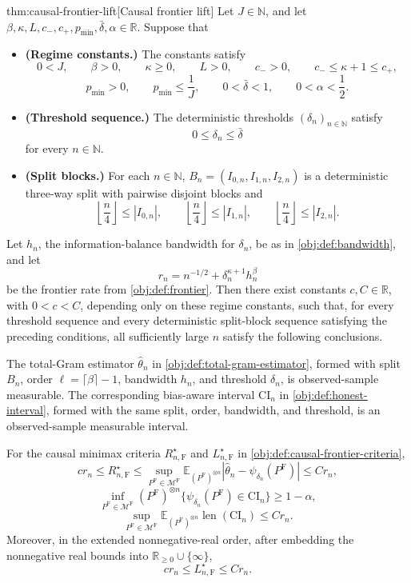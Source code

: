 \begin{theoremv}{thm:causal-frontier-lift}[Causal frontier lift]
Let \(J\in\mathbb N\), and let \(\beta,\kappa,L,c_-,c_+,p_{\min},\bar\delta,\alpha\in\mathbb R\). Suppose that
\begin{itemize}
\item \textbf{(Regime constants.)} The constants satisfy
\[
0<J,\qquad
\beta>0,\qquad
\kappa\geq0,\qquad
L>0,\qquad
c_->0,\qquad
c_-\leq \kappa+1\leq c_+,
\]
\[
p_{\min}>0,\qquad
p_{\min}\leq \frac1J,\qquad
0<\bar\delta<1,\qquad
0<\alpha<\frac12 .
\]
\item \textbf{(Threshold sequence.)} The deterministic thresholds \((\delta_n)_{n\in\mathbb N}\) satisfy
\[
0\leq \delta_n\leq \bar\delta
\]
for every \(n\in\mathbb N\).
\item \textbf{(Split blocks.)} For each \(n\in\mathbb N\), \(B_n=(I_{0,n},I_{1,n},I_{2,n})\) is a deterministic three-way split with pairwise disjoint blocks and
\[
\left\lfloor \frac n4\right\rfloor\leq |I_{0,n}|,\qquad
\left\lfloor \frac n4\right\rfloor\leq |I_{1,n}|,\qquad
\left\lfloor \frac n4\right\rfloor\leq |I_{2,n}|.
\]
\end{itemize}
Let \(h_n\), the information-balance bandwidth for \(\delta_n\), be as in \cref{obj:def:bandwidth}, and let
\[
r_n=n^{-1/2}+\delta_n^{\kappa+1}h_n^\beta
\]
be the frontier rate from \cref{obj:def:frontier}. Then there exist constants \(c,C\in\mathbb R\), with \(0<c<C\), depending only on these regime constants, such that, for every threshold sequence and every deterministic split-block sequence satisfying the preceding conditions, all sufficiently large \(n\) satisfy the following conclusions.

The total-Gram estimator \(\widehat\theta_n\) in \cref{obj:def:total-gram-estimator}, formed with split \(B_n\), order \(\ell=\lceil\beta\rceil-1\), bandwidth \(h_n\), and threshold \(\delta_n\), is observed-sample measurable. The corresponding bias-aware interval \(\mathrm{CI}_n\) in \cref{obj:def:honest-interval}, formed with the same split, order, bandwidth, and threshold, is an observed-sample measurable interval.

For the causal minimax criteria \(R_{n,\mathrm F}^\star\) and \(L_{n,\mathrm F}^\star\) in \cref{obj:def:causal-frontier-criteria},
\[
c r_n\leq R_{n,\mathrm F}^\star
\leq
\sup_{P^{\mathrm F}\in\mathcal M^{\mathrm F}}
\mathbb E_{(P^{\mathrm F})^{\otimes n}}
\left|\widehat\theta_n-\psi_{\delta_n}(P^{\mathrm F})\right|
\leq C r_n,
\]
\[
\inf_{P^{\mathrm F}\in\mathcal M^{\mathrm F}}
(P^{\mathrm F})^{\otimes n}\{\psi_{\delta_n}(P^{\mathrm F})\in \mathrm{CI}_n\}
\geq 1-\alpha,
\]
\[
\sup_{P^{\mathrm F}\in\mathcal M^{\mathrm F}}
\mathbb E_{(P^{\mathrm F})^{\otimes n}}\operatorname{len}(\mathrm{CI}_n)
\leq C r_n.
\]
Moreover, in the extended nonnegative-real order, after embedding the nonnegative real bounds into \(\mathbb R_{\geq0}\cup\{\infty\}\),
\[
c r_n\leq L_{n,\mathrm F}^\star\leq C r_n .
\]
\end{theoremv}

